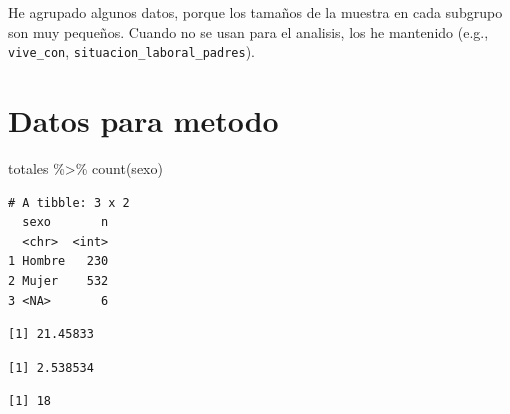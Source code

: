 \documentclass[
  letterpaper,
  DIV=11,
  numbers=noendperiod]{scrartcl}
\newenvironment{Shaded}{\begin{snugshade}}{\end{snugshade}}
\newcommand{\FunctionTok}[1]{\textcolor[rgb]{0.28,0.35,0.67}{#1}}
\newcommand{\NormalTok}[1]{\textcolor[rgb]{0.00,0.23,0.31}{#1}}
\newcommand{\SpecialCharTok}[1]{\textcolor[rgb]{0.37,0.37,0.37}{#1}}
\begin{document}
He agrupado algunos datos, porque los tamaños de la muestra en cada
subgrupo son muy pequeños. Cuando no se usan para el analisis, los he
mantenido (e.g., \texttt{vive\_con},
\texttt{situacion\_laboral\_padres}).

\section{Datos para metodo}\label{datos-para-metodo}

\begin{Shaded}
\begin{Highlighting}[]
\NormalTok{totales }\SpecialCharTok{\%\textgreater{}\%} \FunctionTok{count}\NormalTok{(sexo)}
\end{Highlighting}
\end{Shaded}

\begin{verbatim}
# A tibble: 3 x 2
  sexo       n
  <chr>  <int>
1 Hombre   230
2 Mujer    532
3 <NA>       6
\end{verbatim}

\begin{Shaded}
\end{Shaded}

\begin{verbatim}
[1] 21.45833
\end{verbatim}

\begin{Shaded}
\end{Shaded}

\begin{verbatim}
[1] 2.538534
\end{verbatim}

\begin{Shaded}
\end{Shaded}

\begin{verbatim}
[1] 18
\end{verbatim}
\end{document}
